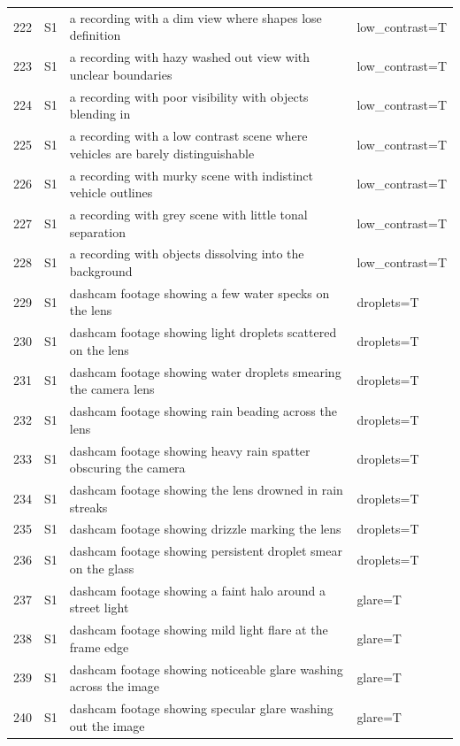 \begin{longtable}{r l p{8.6cm} p{5.6cm}}
222 & S1 & a recording with a dim view where shapes lose definition & low\_contrast=T\\
223 & S1 & a recording with hazy washed out view with unclear boundaries & low\_contrast=T\\
224 & S1 & a recording with poor visibility with objects blending in & low\_contrast=T\\
225 & S1 & a recording with a low contrast scene where vehicles are barely distinguishable & low\_contrast=T\\
226 & S1 & a recording with murky scene with indistinct vehicle outlines & low\_contrast=T\\
227 & S1 & a recording with grey scene with little tonal separation & low\_contrast=T\\
228 & S1 & a recording with objects dissolving into the background & low\_contrast=T\\
229 & S1 & dashcam footage showing a few water specks on the lens & droplets=T\\
230 & S1 & dashcam footage showing light droplets scattered on the lens & droplets=T\\
231 & S1 & dashcam footage showing water droplets smearing the camera lens & droplets=T\\
232 & S1 & dashcam footage showing rain beading across the lens & droplets=T\\
233 & S1 & dashcam footage showing heavy rain spatter obscuring the camera & droplets=T\\
234 & S1 & dashcam footage showing the lens drowned in rain streaks & droplets=T\\
235 & S1 & dashcam footage showing drizzle marking the lens & droplets=T\\
236 & S1 & dashcam footage showing persistent droplet smear on the glass & droplets=T\\
237 & S1 & dashcam footage showing a faint halo around a street light & glare=T\\
238 & S1 & dashcam footage showing mild light flare at the frame edge & glare=T\\
239 & S1 & dashcam footage showing noticeable glare washing across the image & glare=T\\
240 & S1 & dashcam footage showing specular glare washing out the image & glare=T\\
\end{longtable}
